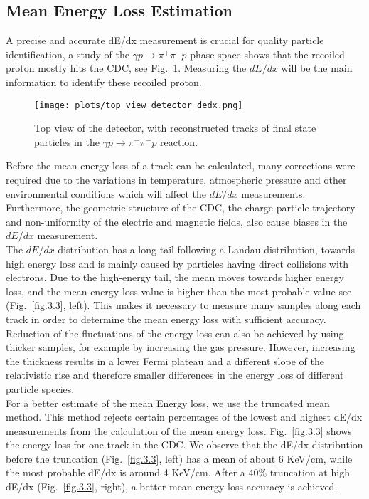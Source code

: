 \subsection{Mean Energy Loss Estimation}
A precise and accurate dE/dx measurement is crucial for quality particle identification, a study of the $\gamma p \rightarrow \pi^{+} \pi^{-} p$ phase space shows that the recoiled proton mostly hits the CDC, see Fig.~\ref{fig.3.2}.
Measuring the $dE/dx$ will be the main information to identify these recoiled proton.
\begin{figure}[H]
    \centering
    \texttt{[image: plots/top\_view\_detector\_dedx.png]}
    \caption{\label{fig.3.2}Top view of the detector, with reconstructed tracks of final state particles in the $\gamma p \rightarrow \pi^{+} \pi^{-} p$ reaction.}
\end{figure}
Before the mean energy loss of a track can be calculated, many corrections were required due to the variations in temperature, atmospheric pressure and other environmental conditions which will affect the $dE/dx$ measurements. Furthermore, the geometric structure of the CDC, the charge-particle trajectory and non-uniformity of the electric and magnetic fields, also cause biases in the $dE/dx$ measurement.\\
The $dE/dx$ distribution has a long tail following a Landau distribution, towards high energy loss and is mainly caused by particles having direct collisions with electrons. Due to the high-energy tail, the mean moves towards higher energy loss, and the mean energy loss value is higher than the most probable value see (Fig.~\ref{fig.3.3}, left). This makes it necessary to measure many samples along each track in order to determine the mean energy loss with sufficient accuracy. Reduction of the fluctuations of the energy loss can also be achieved by using thicker samples, for example by increasing the gas pressure. However, increasing the thickness results in a lower Fermi plateau and a different slope of the relativistic rise and therefore smaller differences in the energy loss of different particle species.\\
For a better estimate of the mean Energy loss, we use the truncated mean method. This method rejects certain percentages of the lowest and highest dE/dx measurements from the calculation of the mean energy loss. Fig.~\ref{fig.3.3} shows the energy loss for one track in the CDC. We observe that the dE/dx distribution before the truncation (Fig.~\ref{fig.3.3}, left) has a mean of about 6 KeV/cm, while the most probable dE/dx is around 4 KeV/cm. After a 40$\%$ truncation at high dE/dx (Fig.~\ref{fig.3.3}, right), a better mean energy loss accuracy is achieved.
